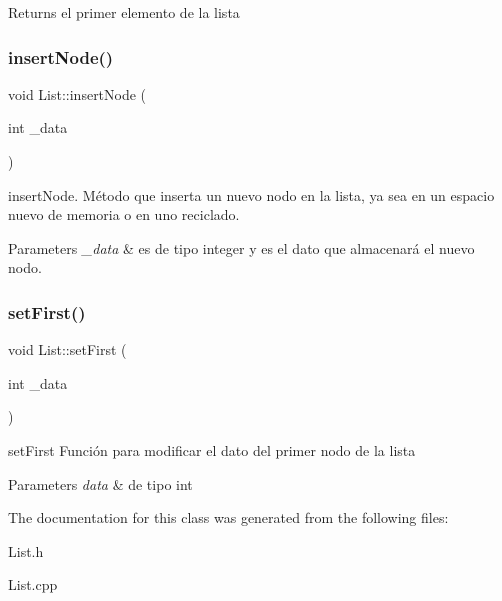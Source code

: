 \begin{DoxyReturn}{Returns}
el primer elemento de la lista 
\end{DoxyReturn}
\mbox{\label{classList_ab85bbd9b130eec1bc1c7139f5458ecfb}} 
\subsubsection{\texorpdfstring{insert\+Node()}{insertNode()}}
{\footnotesize\ttfamily void List\+::insert\+Node (\begin{DoxyParamCaption}\item[{int}]{\+\_\+data }\end{DoxyParamCaption})}

insert\+Node. Método que inserta un nuevo nodo en la lista, ya sea en un espacio nuevo de memoria o en uno reciclado.


\begin{DoxyParams}{Parameters}
{\em \+\_\+data} & es de tipo integer y es el dato que almacenará el nuevo nodo. \\
\hline
\end{DoxyParams}
\mbox{\label{classList_ab5414be89ca36fe1a705e0a65cc3f1e8}} 
\subsubsection{\texorpdfstring{set\+First()}{setFirst()}}
{\footnotesize\ttfamily void List\+::set\+First (\begin{DoxyParamCaption}\item[{int}]{\+\_\+data }\end{DoxyParamCaption})}

set\+First Función para modificar el dato del primer nodo de la lista


\begin{DoxyParams}{Parameters}
{\em data} & de tipo int \\
\hline
\end{DoxyParams}


The documentation for this class was generated from the following files\+:\begin{DoxyCompactItemize}
\item 
List.\+h\item 
List.\+cpp\end{DoxyCompactItemize}
